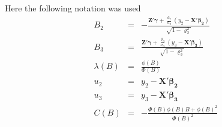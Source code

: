 \documentclass[a4paper]{article}
\begin{document}
Here the following notation was used
\begin{eqnarray}
B_2 &=& -\frac
    {\bm{Z}'\bm{\gamma} + \displaystyle \frac{\varrho_2}{\sigma_2}
      \left( y_2 - \bm{X}'\bm{\beta_2} \right)}
    {\sqrt{ 1 - \varrho_2^2}} \\
B_3 &=& \frac
    {\bm{Z}'\bm{\gamma} + \displaystyle \frac{\varrho_3}{\sigma_3}
      \left( y_3 - \bm{X}'\bm{\beta_3} \right)}
    {\sqrt{ 1 - \varrho_3^2}}\\
\lambda( B) &=& \frac{\phi(B)}{\Phi(B)}\\
u_2 &=& y_2 - \bm{X}'\bm{\beta_2}\\
u_3 &=& y_3 - \bm{X}'\bm{\beta_3}\\
C(B) &=& -\frac{\Phi(B) \phi(B) B + \phi(B)^2}{\Phi(B)^2}
\end{eqnarray}


\end{document}
